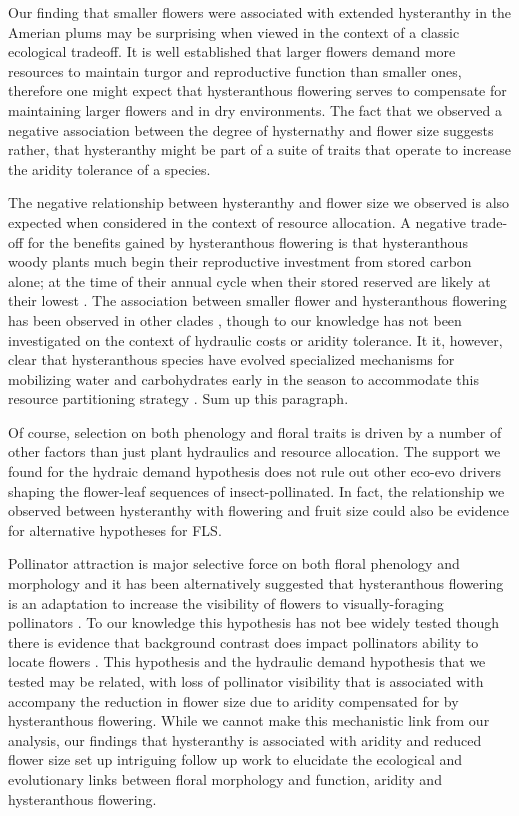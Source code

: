 \documentclass{article}[11pt]
\begin{document}
Our finding that smaller flowers were associated with extended hysteranthy in the Amerian plums may be surprising when viewed in the context of a classic ecological tradeoff. It is well established that larger flowers demand more resources to maintain turgor and reproductive function than smaller ones\citep{Galen:1999vr,Lambrecht:2007ur}, therefore one might expect that hysteranthous flowering serves to compensate for maintaining larger flowers and in dry environments. The fact that we observed a negative association between the degree of hysternathy and flower size suggests rather, that hysteranthy might be part of a suite of traits that operate to increase the aridity tolerance of a species.

The negative relationship between hysteranthy and flower size we observed is also expected when considered in the context of resource allocation. A negative trade-off for the benefits gained by hysteranthous flowering is that hysteranthous woody plants much begin their reproductive investment from stored carbon alone; at the time of their annual cycle when their stored reserved are likely at their lowest \citep{}. The association between smaller flower and hysteranthous flowering has been observed in other clades \citep{}, though to our knowledge has not been investigated on the context of hydraulic costs or aridity tolerance. It it, however, clear that hysteranthous species have evolved specialized mechanisms for mobilizing water and carbohydrates early in the season to accommodate this resource partitioning strategy \citep{}. Sum up this paragraph.

Of course, selection on both phenology and floral traits is driven by a number of other factors than just plant hydraulics and resource allocation. The support we found for the hydraic demand hypothesis does not rule out other eco-evo drivers shaping the flower-leaf sequences of insect-pollinated. In fact, the relationship we observed between hysteranthy with flowering and fruit size could also be evidence for alternative hypotheses for FLS.

Pollinator attraction is major selective force on both floral phenology and morphology \citep{} and it has been alternatively suggested that hysteranthous flowering is an adaptation to increase the visibility of flowers to visually-foraging pollinators \citep{}. To our knowledge this hypothesis has not bee widely tested though there is evidence that background contrast does impact pollinators ability to locate flowers \citep{}. This hypothesis and the hydraulic demand hypothesis that we tested may be related, with loss of pollinator visibility that is associated with accompany the reduction in flower size \citep{} due to aridity compensated for by hysteranthous flowering. While we cannot make this mechanistic link from our analysis, our findings that hysteranthy is associated with aridity and reduced flower size set up intriguing follow up work to elucidate the ecological and evolutionary links between floral morphology and function, aridity and hysteranthous flowering.
\end{document}
